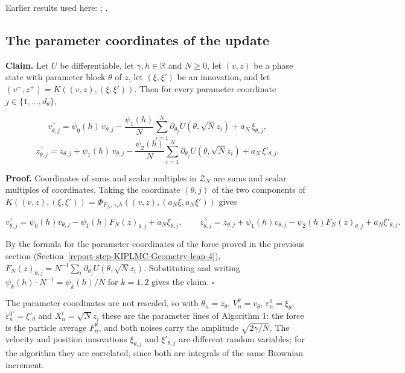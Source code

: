 \documentclass[11pt,a4paper]{report}
\begin{document}
Earlier results used here: \cite[Section~3.1.1]{LangevinLean2026IPLA}; \cite[Section~3.12.2]{LangevinLean2026Kinetic}.
\subsection{\texorpdfstring{The parameter coordinates of the update}{The parameter coordinates of the update}}
\label{report-step-KIPLMC-Exponential-lean-2}


\textbf{Claim.} Let \(U\) be differentiable, let \(\gamma,h\in\mathbb R\) and \(N\ge0\), let \((v,z)\) be a phase state with parameter block \(\theta\) of \(z\), let \((\xi,\xi')\) be an innovation, and let \((v^+,z^+)=K((v,z),(\xi,\xi'))\). Then for every parameter coordinate \(j\in\{1,\dots,d_\theta\}\),


\[v^+_{\theta,j}=\psi_0(h)\,v_{\theta,j}-\frac{\psi_1(h)}N\sum_{i=1}^N\partial_{\theta_j}U(\theta,\sqrt Nz_i)+a_N\,\xi_{\theta,j},\]
\[z^+_{\theta,j}=z_{\theta,j}+\psi_1(h)\,v_{\theta,j}-\frac{\psi_2(h)}N\sum_{i=1}^N\partial_{\theta_j}U(\theta,\sqrt Nz_i)+a_N\,\xi'_{\theta,j}.\]


\textbf{Proof.} Coordinates of sums and scalar multiples in \(\mathcal Z_N\) are sums and scalar multiples of coordinates. Taking the coordinate \((\theta,j)\) of the two components of \(K((v,z),(\xi,\xi'))=\Phi_{F_N,\gamma,h}((v,z),(a_N\xi,a_N\xi'))\) gives


\[v^+_{\theta,j}=\psi_0(h)v_{\theta,j}-\psi_1(h)F_N(z)_{\theta,j}+a_N\xi_{\theta,j},\qquad z^+_{\theta,j}=z_{\theta,j}+\psi_1(h)v_{\theta,j}-\psi_2(h)F_N(z)_{\theta,j}+a_N\xi'_{\theta,j}.\]


By the formula for the parameter coordinates of the force proved in the previous section (Section~\ref{report-step-KIPLMC-Geometry-lean-4}), \(F_N(z)_{\theta,j}=N^{-1}\sum_i\partial_{\theta_j}U(\theta,\sqrt Nz_i)\). Substituting and writing \(\psi_k(h)\cdot N^{-1}=\psi_k(h)/N\) for \(k=1,2\) gives the claim. \(\square\)




The parameter coordinates are not rescaled, so with \(\theta_n=z_\theta\), \(V^\theta_n=v_\theta\), \(\varepsilon^0_n=\xi_\theta\), \(\varepsilon^{0\prime}_n=\xi'_\theta\) and \(X^i_n=\sqrt Nz_i\) these are the parameter lines of Algorithm 1: the force is the particle average \(F^\theta_n\), and both noises carry the amplitude \(\sqrt{2\gamma/N}\). The velocity and position innovations \(\xi_{\theta,j}\) and \(\xi'_{\theta,j}\) are different random variables; for the algorithm they are correlated, since both are integrals of the same Brownian increment.
\end{document}
